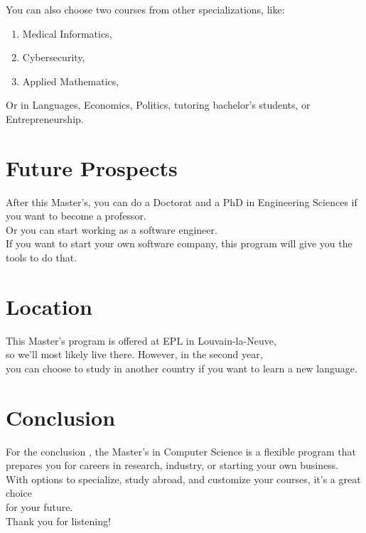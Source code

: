 \documentclass{article}
\begin{document}
You can also choose two courses from other specializations, like: \\
\begin{enumerate} 
 \item Medical Informatics,  
  \item Cybersecurity,  
  \item Applied Mathematics, 
\end{enumerate}
Or in Languages, Economics, Politics, tutoring bachelor’s students, 
or Entrepreneurship.  \\


\section{Future Prospects}

After this Master’s, you can do a Doctorat and a PhD in Engineering Sciences 
if you want to become a professor.  \\

Or you can start working as a software engineer. \\ 

If you want to start your own software company, this program will give you the tools to do that.\\

\section{Location}

This Master’s program is offered at EPL in Louvain-la-Neuve, \\
so we’ll most likely live there. However, in the second year, \\
you can choose to study in another country if you want to learn a new language.

\section{Conclusion}

For the conclusion , the Master’s in Computer Science is a flexible program that \\
prepares you for careers in research, industry, or starting your own business. \\
With options to specialize, study abroad, and customize your courses, it’s a great choice \\
for your future.  \\

Thank you for listening!
\end{document}
